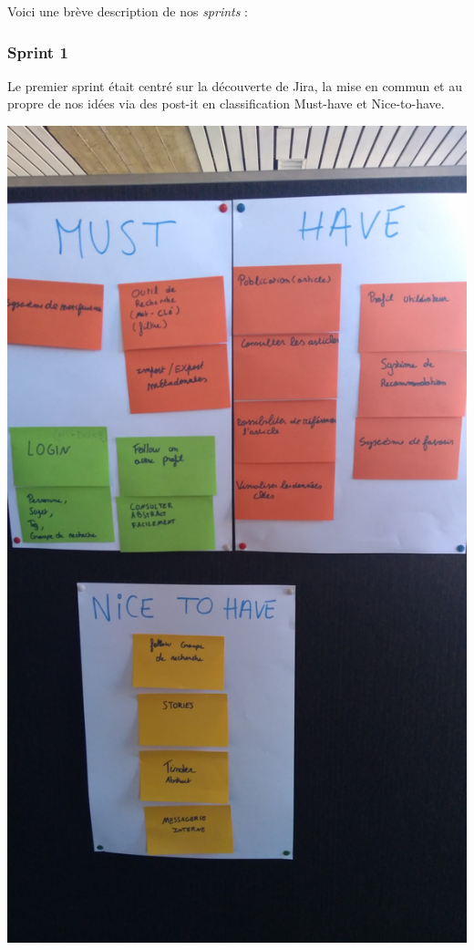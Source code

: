 \documentclass[t, 12pt, usenames,dvipsnames]{article}
\begin{document}
        \newpage
        
        \noindent Voici une brève description de nos \textit{sprints} : 

            \subsubsection{Sprint 1}
                \noindent Le premier sprint était centré sur la découverte de  Jira, la mise en commun et au propre de nos idées via des post-it en classification Must-have et Nice-to-have. 
                
                                
                 \begin{center}                       \includegraphics[scale=.07]{images/sprint/must-nice-have.jpg}
                    \label{fig:sprint1_graph}
                \end{center}
                
\end{document}
